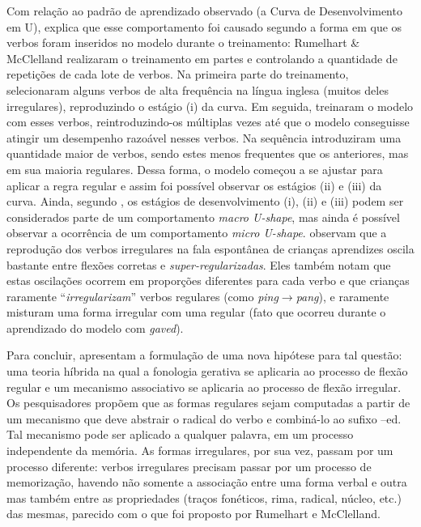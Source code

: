 Com relação ao padrão de aprendizado observado (a Curva de Desenvolvimento em U), \cite{Pinker:1999} explica que esse comportamento foi causado segundo a forma em que os verbos foram inseridos no modelo durante o treinamento: Rumelhart \& McClelland realizaram o treinamento em partes e controlando a quantidade de repetições de cada lote de verbos. Na primeira parte do treinamento, selecionaram alguns verbos de alta frequência na língua inglesa (muitos deles irregulares), reproduzindo o estágio (i) da curva. Em seguida, treinaram o modelo com esses verbos, reintroduzindo-os múltiplas vezes até que o modelo conseguisse atingir um desempenho razoável nesses verbos. Na sequência introduziram uma quantidade maior de verbos, sendo estes menos frequentes que os anteriores, mas em sua maioria regulares. Dessa forma, o modelo começou a se ajustar para aplicar a regra regular e assim foi possível observar os estágios (ii) e (iii) da curva. Ainda, segundo \cite{pluket:1991}, os estágios de desenvolvimento (i), (ii) e (iii) podem ser considerados parte de um comportamento \textit{macro U-shape}, mas ainda é possível observar a ocorrência de um comportamento \textit{micro U-shape}. \cite{pluket:1991} observam que a reprodução dos verbos irregulares na fala espontânea de crianças aprendizes oscila bastante entre flexões corretas e \textit{super-regularizadas}. Eles também notam que estas oscilações ocorrem em proporções diferentes para cada verbo e que crianças raramente “\textit{irregularizam}” verbos regulares (como \textit{ping}$\rightarrow$\textit{pang}), e raramente misturam uma forma irregular com uma regular (fato que ocorreu durante o aprendizado do modelo com \textit{gaved}).

Para concluir, \cite{Pinker:1988} apresentam a formulação de uma nova hipótese para tal questão: uma teoria híbrida na qual a fonologia gerativa se aplicaria ao processo de flexão regular e um mecanismo associativo se aplicaria ao processo de flexão irregular. Os pesquisadores propõem que as formas regulares sejam computadas a partir de um mecanismo que deve abstrair o radical do verbo e combiná-lo ao sufixo –ed.  Tal mecanismo pode ser aplicado a qualquer palavra, em um processo independente da memória. As formas irregulares, por sua vez, passam por um processo diferente: verbos irregulares precisam passar por um processo de memorização, havendo não somente a associação entre uma forma verbal e outra mas também entre as propriedades (traços fonéticos, rima, radical, núcleo, etc.) das mesmas, parecido com o que foi proposto por Rumelhart e McClelland.

